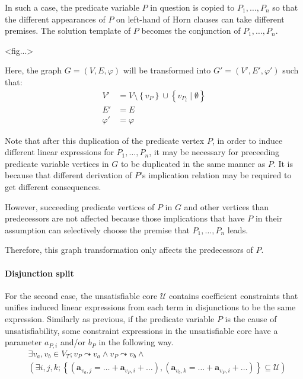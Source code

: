 \documentclass[a4paper,12pt]{article}
\begin{document}
In such a case, the predicate variable $P$ in question is copied to
$P_1, \ldots, P_n$ so that the different appearances of $P$ on
left-hand of Horn clauses can take different premises.  The solution
template of $P$ becomes the conjunction of $P_1, \ldots, P_n$.

<fig...>

Here, the graph $G=(V,E,\varphi)$ will be transformed into
$G'=(V',E',\varphi')$ such that:
\begin{align*}
V' & = V \setminus \left\lbrace v_P \right\rbrace \cup
  \left\lbrace v_{P_i} \mid \emptyset \right\rbrace \\
E' & = E \\
\varphi' & = \varphi
\end{align*}

Note that after this duplication of the predicate vertex $P$, in order
to induce different linear expressions for $P_1, \ldots, P_n$, it may
be necessary for preceeding predicate variable vertices in $G$ to be
duplicated in the same manner as $P$. It is because that different
derivation of $P$'s implication relation may be required to get
different consequences.

However, succeeding predicate vertices of $P$ in $G$ and other
vertices than predecessors are not affected because those implications
that have $P$ in their assumption can selectively choose the premise
that $P_1, \ldots, P_n$ leads.

Therefore, this graph transformation only affects the predecessors of
$P$.

\paragraph{Disjunction split}
For the second case, the unsatisfiable core $\mathcal{U}$ contains
coefficient constraints that unifies induced linear expressions from
each term in disjunctions to be the same expression.  Similarly as
previous, if the predicate variable $P$ is the cause of
unsatisfiability, some constraint expressions in the unsatisfiable
core have a parameter $a_{P,i}$ and/or $b_P$ in the following way.
\begin{align*}
& \exists v_a, v_b \in V_T; v_P \leadsto v_a \wedge v_P \leadsto v_b \wedge \\
& \left( \exists i, j, k;
\left\lbrace \left( \mathbf{a}_{v_a,j} = \ldots + \mathbf{a}_{v_P,i} + \ldots \right),
\left( \mathbf{a}_{v_b,k} = \ldots + \mathbf{a}_{v_P,i} + \ldots \right)
\right\rbrace \subseteq \mathcal{U} \right)
\end{align*}
\end{document}

